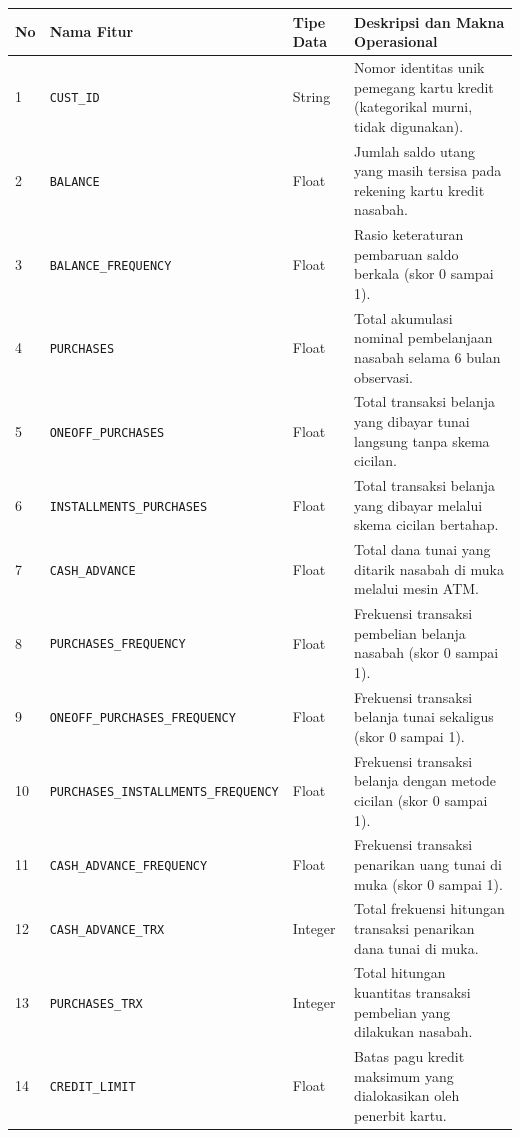 \documentclass[a4paper,oneside,12pt]{report}
\begin{document}
\begin{table}[htbp]
\centering
\scriptsize
\renewcommand{\arraystretch}{0.88}
\begin{tabularx}{\textwidth}{p{0.5cm} p{4.0cm} p{1.3cm} >{\raggedright\arraybackslash}X}
\toprule
\textbf{No} & \textbf{Nama Fitur} & \textbf{Tipe Data} & \textbf{Deskripsi dan Makna Operasional} \\
\midrule
1 & \texttt{CUST\_ID} & String & Nomor identitas unik pemegang kartu kredit (kategorikal murni, tidak digunakan). \\
2 & \texttt{BALANCE} & Float & Jumlah saldo utang yang masih tersisa pada rekening kartu kredit nasabah. \\
3 & \texttt{BALANCE\_FREQUENCY} & Float & Rasio keteraturan pembaruan saldo berkala (skor 0 sampai 1). \\
4 & \texttt{PURCHASES} & Float & Total akumulasi nominal pembelanjaan nasabah selama 6 bulan observasi. \\
5 & \texttt{ONEOFF\_PURCHASES} & Float & Total transaksi belanja yang dibayar tunai langsung tanpa skema cicilan. \\
6 & \texttt{INSTALLMENTS\_PURCHASES} & Float & Total transaksi belanja yang dibayar melalui skema cicilan bertahap. \\
7 & \texttt{CASH\_ADVANCE} & Float & Total dana tunai yang ditarik nasabah di muka melalui mesin ATM. \\
8 & \texttt{PURCHASES\_FREQUENCY} & Float & Frekuensi transaksi pembelian belanja nasabah (skor 0 sampai 1). \\
9 & \texttt{ONEOFF\_PURCHASES\_}\newline\texttt{FREQUENCY} & Float & Frekuensi transaksi belanja tunai sekaligus (skor 0 sampai 1). \\
10 & \texttt{PURCHASES\_INSTALLMENTS\_}\newline\texttt{FREQUENCY} & Float & Frekuensi transaksi belanja dengan metode cicilan (skor 0 sampai 1). \\
11 & \texttt{CASH\_ADVANCE\_FREQUENCY} & Float & Frekuensi transaksi penarikan uang tunai di muka (skor 0 sampai 1). \\
12 & \texttt{CASH\_ADVANCE\_TRX} & Integer & Total frekuensi hitungan transaksi penarikan dana tunai di muka. \\
13 & \texttt{PURCHASES\_TRX} & Integer & Total hitungan kuantitas transaksi pembelian yang dilakukan nasabah. \\
14 & \texttt{CREDIT\_LIMIT} & Float & Batas pagu kredit maksimum yang dialokasikan oleh penerbit kartu. \\

\end{tabularx}
\end{table}
\end{document}
